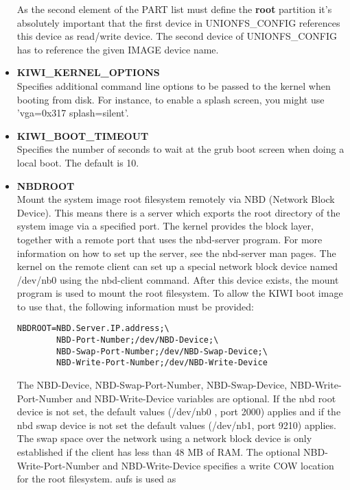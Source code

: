 \begin{itemize}
        As the second element of the PART list must define the \textbf{root}
        partition it's absolutely important that the first device in
        UNIONFS\_CONFIG references this device as read/write device.
        The second device of UNIONFS\_CONFIG has to reference the given
        IMAGE device name.
    \item \textbf{KIWI\_KERNEL\_OPTIONS}\\
        Specifies additional command line options to be passed to
        the kernel when booting from disk.  For instance, to enable
        a splash screen, you might use 'vga=0x317 splash=silent'.
    \item \textbf{KIWI\_BOOT\_TIMEOUT}\\
        Specifies the number of seconds to wait at the grub boot
        screen when doing a local boot.  The default is 10.
    \item \textbf{NBDROOT}\\
        Mount the system image root filesystem remotely via
        NBD (Network Block Device). This means there is a server
        which exports the root directory of the system image via a
        specified port. The kernel provides the block layer, together with a
        remote port that uses the nbd-server program. For more information
        on how to set up the server, see the nbd-server man pages. The
        kernel on the remote client can set up a special network block
        device named /dev/nb0 using the nbd-client command. After this
        device exists, the mount program is used to mount the root
        filesystem. To allow the KIWI boot image to use that, the following
        information must be provided:
\begin{verbatim}
NBDROOT=NBD.Server.IP.address;\
        NBD-Port-Number;/dev/NBD-Device;\
        NBD-Swap-Port-Number;/dev/NBD-Swap-Device;\
        NBD-Write-Port-Number;/dev/NBD-Write-Device
\end{verbatim}
        The NBD-Device, NBD-Swap-Port-Number, NBD-Swap-Device,
        NBD-Write-Port-Number and NBD-Write-Device
        variables are optional. If the nbd root device is not set,
        the default values (/dev/nb0 , port 2000) applies and if the nbd
        swap device is not set the default values (/dev/nb1, port 9210)
        applies. The swap space over the network using a network block device
        is only established if the client has less than 48 MB of RAM.
        The optional NBD-Write-Port-Number and NBD-Write-Device specifies
        a write COW location for the root filesystem. aufs is used as

\end{itemize}
